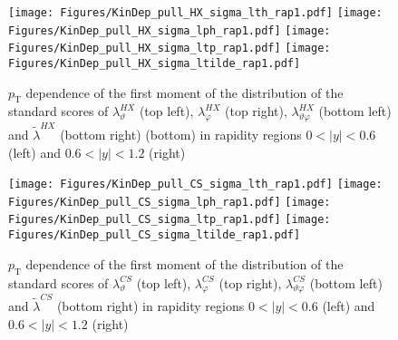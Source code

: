 \documentclass[12pt]{article}
\newcommand{\pT}{p_\mathrm{T}}
\newcommand{\absy}{\left |  y \right |}
\newcommand{\lamthCS}{\lambda^{\scriptscriptstyle CS}_\vartheta}
\newcommand{\lamphCS}{\lambda^{\scriptscriptstyle CS}_\varphi}
\newcommand{\lamthphCS}{\lambda^{\scriptscriptstyle CS}_{\vartheta \varphi}}
\newcommand{\lamtildeCS}{\tilde{\lambda}^{\scriptscriptstyle CS}}
\newcommand{\lamthHX}{\lambda^{\scriptscriptstyle HX}_\vartheta}
\newcommand{\lamphHX}{\lambda^{\scriptscriptstyle HX}_\varphi}
\newcommand{\lamthphHX}{\lambda^{\scriptscriptstyle HX}_{\vartheta \varphi}}
\newcommand{\lamtildeHX}{\tilde{\lambda}^{\scriptscriptstyle HX}}
\begin{document}
\begin{figure}[htbp]
\centering
\texttt{[image: Figures/KinDep\_pull\_HX\_sigma\_lth\_rap1.pdf]}
\texttt{[image: Figures/KinDep\_pull\_HX\_sigma\_lph\_rap1.pdf]}
\texttt{[image: Figures/KinDep\_pull\_HX\_sigma\_ltp\_rap1.pdf]}
\texttt{[image: Figures/KinDep\_pull\_HX\_sigma\_ltilde\_rap1.pdf]}
\caption{$\pT$ dependence of the first moment of the distribution of the
standard scores of $\lamthHX$ (top left), $\lamphHX$ (top right), $\lamthphHX$ (bottom left) and $\lamtildeHX$ (bottom right) (bottom)
in rapidity regions $0<\absy<0.6$ (left) and $0.6<\absy<1.2$ (right)}
\end{figure}
\clearpage

\begin{figure}[htbp]
\centering
\texttt{[image: Figures/KinDep\_pull\_CS\_sigma\_lth\_rap1.pdf]}
\texttt{[image: Figures/KinDep\_pull\_CS\_sigma\_lph\_rap1.pdf]}
\texttt{[image: Figures/KinDep\_pull\_CS\_sigma\_ltp\_rap1.pdf]}
\texttt{[image: Figures/KinDep\_pull\_CS\_sigma\_ltilde\_rap1.pdf]}
\caption{$\pT$ dependence of the first moment of the distribution of the
standard scores of $\lamthCS$ (top left), $\lamphCS$ (top right), $\lamthphCS$ (bottom left) and $\lamtildeCS$ (bottom right)
in rapidity regions $0<\absy<0.6$ (left) and $0.6<\absy<1.2$ (right)}
\end{figure}
\clearpage
\end{document}
